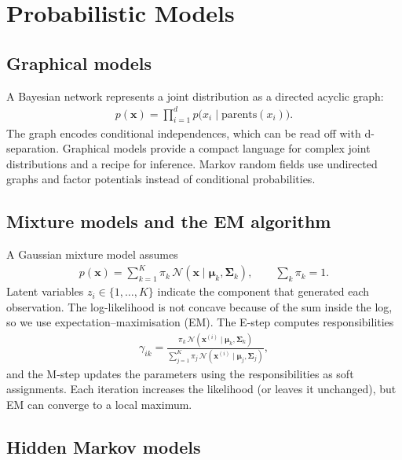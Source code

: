 \documentclass[a4paper, 12pt]{book}
\begin{document}

\chapter{Probabilistic Models}
\label{ch:probmodels}

\section{Graphical models}

A Bayesian network represents a joint distribution as a directed acyclic graph:
\begin{align}
    p(\mathbf{x}) = \prod_{i=1}^d p\big(x_i \mid \mathrm{parents}(x_i)\big).
\end{align}
The graph encodes conditional independences, which can be read off with
d-separation. Graphical models provide a compact language for complex joint
distributions and a recipe for inference. Markov random fields use undirected graphs
and factor potentials instead of conditional probabilities.

\section{Mixture models and the EM algorithm}

A Gaussian mixture model assumes
\begin{align}
    p(\mathbf{x}) = \sum_{k=1}^K \pi_k\,\mathcal{N}(\mathbf{x}\mid
    \boldsymbol{\mu}_k,\boldsymbol{\Sigma}_k),
    \qquad \sum_k \pi_k = 1.
\end{align}
Latent variables $z_i \in \{1,\ldots,K\}$ indicate the component that generated each
observation. The log-likelihood is not concave because of the sum inside the log, so
we use expectation--maximisation (EM). The E-step computes responsibilities
\begin{align}
    \gamma_{ik} = \frac{\pi_k\,\mathcal{N}(\mathbf{x}^{(i)}\mid\boldsymbol{\mu}_k,
    \boldsymbol{\Sigma}_k)}{\sum_{j=1}^K \pi_j\,\mathcal{N}(\mathbf{x}^{(i)}\mid
    \boldsymbol{\mu}_j,\boldsymbol{\Sigma}_j)},
\end{align}
and the M-step updates the parameters using the responsibilities as soft assignments.
Each iteration increases the likelihood (or leaves it unchanged), but EM can converge
to a local maximum.

\section{Hidden Markov models}
\end{document}
